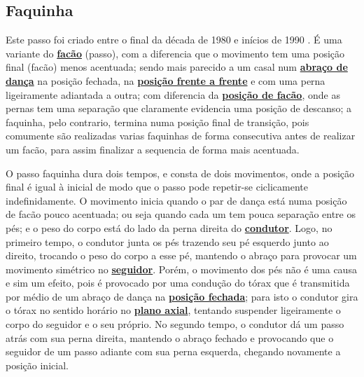 \subsection{Faquinha}

Este passo foi  criado entre o final da década de 1980 e inícios de 1990  \cite[pp. 143]{perna2002samba}.
É uma variante do  \hyperref[subsec:desc:passo:facao]{\textbf{facão}} (passo), 
com a diferencia que o movimento tem uma posição final (facão) menos acentuada;
sendo mais parecido a um casal num \hyperref[def:abracodedanca]{\textbf{abraço de dança}} na posição fechada, 
na \hyperref[def:frente-frente-position]{\textbf{posição frente a frente}}  e com uma perna ligeiramente adiantada a outra;
com diferencia da \hyperref[def:facao-position]{\textbf{posição de facão}}, 
onde as pernas tem uma separação que claramente evidencia uma posição de descanso;
a faquinha, pelo contrario, termina numa posição final de transição, 
pois comumente são realizadas varias faquinhas de forma consecutiva antes de realizar um facão,
 para assim finalizar a sequencia de forma mais acentuada.
 
O passo faquinha dura dois tempos, e consta de dois movimentos, 
onde a posição final é igual à inicial de modo que o passo pode repetir-se ciclicamente indefinidamente.
O movimento inicia quando o par de dança está numa posição de facão pouco acentuada;
ou seja quando cada um tem pouca separação entre os pés; 
e o peso do corpo está do lado da perna direita do \hyperref[def:Condutor]{\textbf{condutor}}.
Logo, no primeiro tempo, 
o condutor junta os pés trazendo seu pé esquerdo junto ao direito, trocando o peso do corpo a esse pé,
mantendo o abraço para provocar um movimento simétrico no \hyperref[def:Seguidor]{\textbf{seguidor}}.
Porém, o movimento dos pés não é uma causa e sim um efeito,
pois é provocado por uma condução do tórax que é transmitida por médio de um abraço de dança na 
\hyperref[def:closed-position]{\textbf{posição fechada}};
para isto o condutor gira o tórax no sentido horário no \hyperref[def:PlanoAxial]{\textbf{plano axial}},
tentando suspender ligeiramente o corpo do seguidor e o seu próprio.
No segundo tempo, o condutor dá um passo atrás com sua perna direita,
 mantendo o abraço fechado e provocando que o seguidor de um passo adiante com sua perna esquerda,
chegando novamente a posição inicial.


